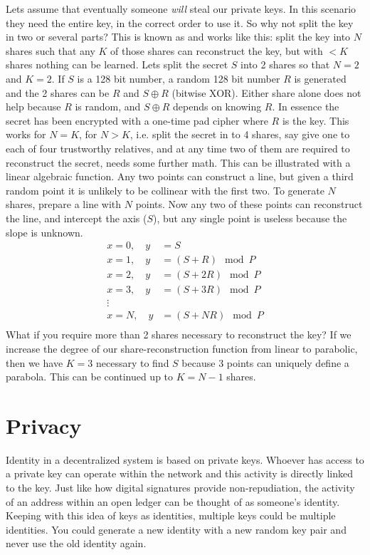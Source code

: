 Lets assume that eventually someone \textit{will} steal our private keys. In this scenario they need the entire key, in the correct order to use it. So why not split the key in two or several parts? This is known as  and works like this: split the key into $N$ shares such that any $K$ of those shares can reconstruct the key, but with $<K$ shares nothing can be learned. Lets split the secret $S$  into 2 shares so that $N=2$ and $K=2$. If $S$ is a 128 bit number, a random 128 bit number $R$ is generated and the 2 shares can be $R$ and $S\oplus R$ (bitwise XOR). Either share alone does not help because $R$ is random, and $S\oplus R$ depends on knowing $R$. In essence the secret has been encrypted with a one-time pad cipher where $R$ is the key. This works for $N=K$, for $N>K$, i.e. split the secret in to 4 shares, say give one to each of four trustworthy relatives, and at any time two of them are required to reconstruct the secret, needs some further math. This can be illustrated with a linear algebraic function. Any two points can construct a line, but given a third random point it is unlikely to be collinear with the first two. To generate $N$ shares, prepare a line with $N$ points. Now any two of these points can reconstruct the line, and intercept the axis ($S$), but any single point is useless because the slope is unknown.
\begin{align*}
x=0,\quad y&=S\\
x=1,\quad y&=(S+R)\mod P\\
x=2,\quad y&=(S+2R)\mod P\\
x=3,\quad y&=(S+3R)\mod P\\
\vdots\\
x=N,\quad y&=(S+NR)\mod P\\
\end{align*}
What if you require more than 2 shares necessary to reconstruct the key? If we increase the degree of our share-reconstruction function from linear to parabolic, then we have $K=3$ necessary to find $S$ because 3 points can uniquely define a parabola. This can be continued up to $K=N-1$ shares.



\section{Privacy}\label{Se:Privacy}
Identity in a decentralized system is based on private keys. Whoever has access to a private key can operate within the network and this activity is directly linked to the key. Just like how digital signatures provide non-repudiation, the activity of an address within an open ledger can be thought of as someone's identity. Keeping with this idea of keys as identities, multiple keys could be multiple identities. You could generate a new identity with a new random key pair and never use the old identity again. 

